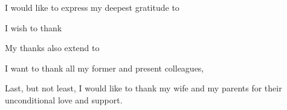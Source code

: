 
I would like to express my deepest gratitude to 

I wish to thank 

My thanks also extend to 

I want to thank all my former and present colleagues,

Last, but not least, I would like to thank my wife and my parents for their unconditional love and support.
